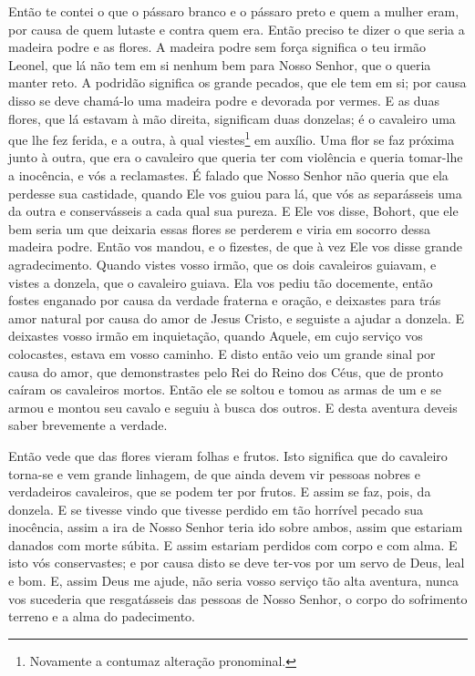 Então te contei o que o pássaro branco e o pássaro preto e quem a mulher eram,
por causa de quem lutaste e contra quem era. Então preciso te dizer o que seria
a madeira podre e as flores. A madeira podre sem força significa o teu irmão
Leonel, que lá não tem em si nenhum bem para Nosso Senhor, que o queria manter
reto. A podridão significa os grande pecados, que ele tem em si; por causa
disso se deve chamá-lo uma madeira podre e devorada por vermes. E as duas
flores, que lá estavam à mão direita, significam duas donzelas; é o cavaleiro
uma que lhe fez ferida, e a outra, à qual viestes\footnote{ Novamente a
contumaz alteração pronominal. } em auxílio. Uma flor se faz próxima
junto à outra, que era o cavaleiro que queria ter com violência e queria
tomar-lhe a inocência, e vós a reclamastes. É falado que Nosso Senhor não
queria que ela perdesse sua castidade, quando Ele vos guiou para lá, que vós as
separásseis uma da outra e conservásseis a cada qual sua pureza. E Ele vos
disse, Bohort, que ele bem seria um que deixaria essas flores se perderem e
viria em socorro dessa madeira podre. Então vos mandou, e o fizestes, de que à
vez Ele vos disse grande agradecimento. Quando vistes vosso irmão, que os dois
cavaleiros guiavam, e vistes a donzela, que o cavaleiro guiava. Ela vos pediu
tão docemente, então fostes enganado por causa da verdade fraterna e oração, e
deixastes para trás amor natural por causa do amor de Jesus Cristo, e seguiste
a ajudar a donzela. E deixastes vosso irmão em inquietação,
quando Aquele, em cujo serviço vos colocastes, estava em vosso caminho. E disto
então veio um grande sinal por causa do amor, que demonstrastes pelo Rei do
Reino dos Céus, que de pronto caíram os cavaleiros mortos. Então ele se soltou
e tomou as armas de um e se armou e montou seu cavalo e seguiu à busca dos
outros. E desta aventura deveis saber brevemente a verdade. 

Então vede que das flores vieram folhas e frutos. Isto significa que do
cavaleiro torna-se e vem grande linhagem, de que ainda devem vir pessoas nobres
e verdadeiros cavaleiros, que se podem ter por frutos. E assim se faz, pois, da
donzela. E se tivesse vindo que tivesse perdido em tão horrível pecado sua
inocência, assim a ira de Nosso Senhor teria ido sobre ambos, assim que
estariam danados com morte súbita. E assim estariam perdidos com corpo e com
alma. E isto vós conservastes; e por causa disto se deve ter-vos por um servo
de Deus, leal e bom. E, assim Deus me ajude, não seria vosso serviço tão alta
aventura, nunca vos sucederia que resgatásseis das pessoas de Nosso Senhor, o
corpo do sofrimento terreno e a alma do padecimento.


